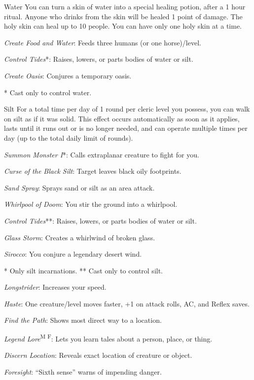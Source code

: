 {Water}
{You can turn a skin of water into a special healing potion, after a 1 hour ritual. Anyone who drinks from the skin will be healed 1 point of damage. The holy skin can heal up to 10 people. You can have only one holy skin at a time.}
{
	\item 
	\item 
	\item \textit{Create Food and Water}: Feeds three humans (or one horse)/level.
	\item \textit{Control Tides}*: Raises, lowers, or parts bodies of water or silt.
	\item
	\item
	\item \textit{Create Oasis}: Conjures a temporary oasis.
	\item 
	\item 
}
* Cast only to control water.

{Silt}
{For a total time per day of 1 round per cleric level you possess, you can walk on silt as if it was solid. This effect occurs automatically as soon as it applies, lasts until it runs out or is no longer needed, and can operate multiple times per day (up to the total daily limit of rounds).}
{
	\item \textit{Summon Monster I}*: Calls extraplanar creature to fight for you.
	\item \textit{Curse of the Black Silt}: Target leaves black oily footprints.
	\item \textit{Sand Spray}: Sprays sand or silt as an area attack.
	\item \textit{Whirlpool of Doom}: You stir the ground into a whirlpool.
	\item \textit{Control Tides}**: Raises, lowers, or parts bodies of water or silt.
	\item
	\item \textit{Glass Storm}: Creates a whirlwind of broken glass.
	\item \textit{Sirocco}: You conjure a legendary desert wind.
	\item 
}
* Only silt incarnations.
** Cast only to control silt.

{}
{}
{
	\item \textit{Longstrider}: Increases your speed.
	\item 
	\item 
	\item \textit{Haste}: One creature/level moves faster, +1 on attack rolls, AC, and Reflex saves.
	\item 
	\item \textit{Find the Path}: Shows most direct way to a location.
	\item \textit{Legend Lore}\textsuperscript{M F}: Lets you learn tales about a person, place, or thing.
	\item \textit{Discern Location}: Reveals exact location of creature or object.
	\item \textit{Foresight}: ``Sixth sense'' warns of impending danger.
}

